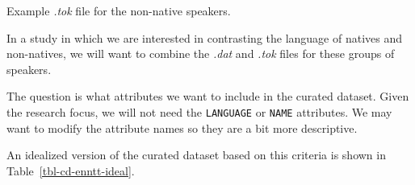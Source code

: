 \documentclass[
  letterpaper,
]{latex/krantz}
\newenvironment{Shaded}{\begin{snugshade}}{\end{snugshade}}
\newcommand{\NormalTok}[1]{\textcolor[rgb]{0.00,0.00,0.00}{#1}}
\theoremstyle{definition}
\theoremstyle{remark}
\begin{document}
\begin{codelisting}

\caption{\label{lst-cd-enntt-nonnatives-tok}Example \emph{.tok} file for
the non-native speakers.}

\centering{

\begin{Shaded}
\begin{Highlighting}[]
\NormalTok{The Commission is following with interest the planned construction of a nuclear power plant in Akkuyu , Turkey and recognises the importance of ensuring that the construction of the new plant follows the highest internationally accepted nuclear safety standards .}
\NormalTok{According to our information , the decision on the selection of a bidder has not been taken yet .}
\end{Highlighting}
\end{Shaded}

}

\end{codelisting}%

In a study in which we are interested in contrasting the language of
natives and non-natives, we will want to combine the \emph{.dat} and
\emph{.tok} files for these groups of speakers.

The question is what attributes we want to include in the curated
dataset. Given the research focus, we will not need the
\texttt{LANGUAGE} or \texttt{NAME} attributes. We may want to modify the
attribute names so they are a bit more descriptive.

An idealized version of the curated dataset based on this criteria is
shown in Table~\ref{tbl-cd-enntt-ideal}.
\end{document}
